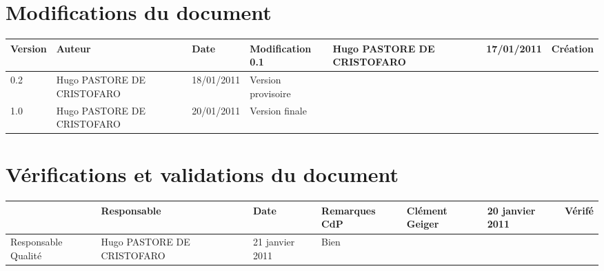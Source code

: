 
\section*{Modifications du document}

\begin{center}
\begin{longtable}{|m{14mm}||m{36mm}|m{36mm}|m{60mm}|}
\hline
Version & Auteur & Date & Modification\endhead \hline
0.1
& %
Hugo PASTORE DE CRISTOFARO
& %
17/01/2011
& %
Création
\\\hline
0.2
& %
Hugo PASTORE DE CRISTOFARO
& %
18/01/2011
& %
Version provisoire
\\\hline
1.0
& %
Hugo PASTORE DE CRISTOFARO
& %
20/01/2011
& %
Version finale
\\\hline
\end{longtable}
\end{center}


\section*{Vérifications et validations du document}

\begin{center}
\begin{longtable}{|m{15mm}|m{36mm}|m{36mm}|m{60mm}|}
\hline
 & Responsable & Date & Remarques\endhead \hline
CdP
& %
Clément Geiger
& %
20 janvier 2011
& %
Vérifé
\\\hline
Responsable Qualité
& %
Hugo PASTORE DE CRISTOFARO
& %
21 janvier 2011
& %
Bien
\\\hline
\end{longtable}
\end{center}

\pagebreak
